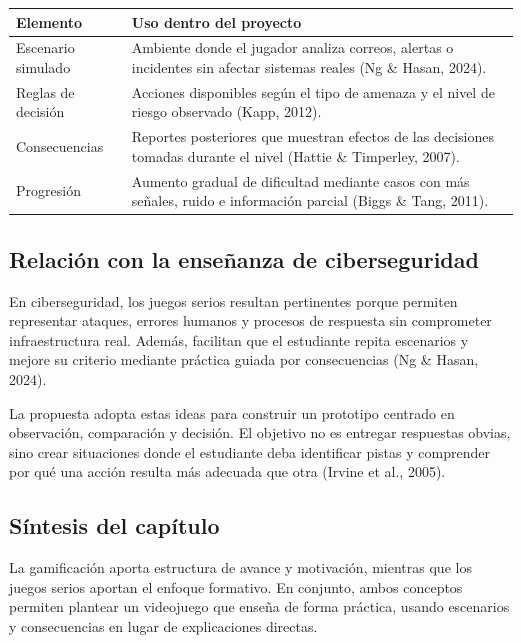 \begin{center}
\begin{tabular}{|p{}|p{}|}
\hline
\textbf{Elemento} & \textbf{Uso dentro del proyecto} \\
\hline
Escenario simulado & Ambiente donde el jugador analiza correos, alertas o incidentes sin afectar sistemas reales (Ng \& Hasan, 2024). \\
\hline
Reglas de decisi\'{o}n & Acciones disponibles seg\'{u}n el tipo de amenaza y el nivel de riesgo observado (Kapp, 2012). \\
\hline
Consecuencias & Reportes posteriores que muestran efectos de las decisiones tomadas durante el nivel (Hattie \& Timperley, 2007). \\
\hline
Progresi\'{o}n & Aumento gradual de dificultad mediante casos con m\'{a}s se\~{n}ales, ruido e informaci\'{o}n parcial (Biggs \& Tang, 2011). \\
\hline
\end{tabular}
\end{center}

\subsection{Relaci\'{o}n con la ense\~{n}anza de ciberseguridad}

En ciberseguridad, los juegos serios resultan pertinentes porque permiten representar ataques, errores humanos y procesos de respuesta sin comprometer infraestructura real. Adem\'{a}s, facilitan que el estudiante repita escenarios y mejore su criterio mediante pr\'{a}ctica guiada por consecuencias (Ng \& Hasan, 2024).

La propuesta adopta estas ideas para construir un prototipo centrado en observaci\'{o}n, comparaci\'{o}n y decisi\'{o}n. El objetivo no es entregar respuestas obvias, sino crear situaciones donde el estudiante deba identificar pistas y comprender por qu\'{e} una acci\'{o}n resulta m\'{a}s adecuada que otra (Irvine et al., 2005).

\subsection{S\'{i}ntesis del cap\'{i}tulo}

La gamificaci\'{o}n aporta estructura de avance y motivaci\'{o}n, mientras que los juegos serios aportan el enfoque formativo. En conjunto, ambos conceptos permiten plantear un videojuego que ense\~{n}a de forma pr\'{a}ctica, usando escenarios y consecuencias en lugar de explicaciones directas.
